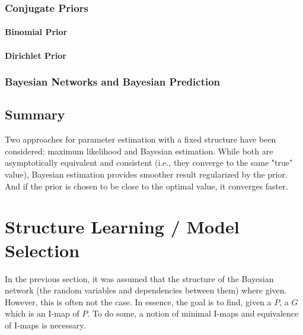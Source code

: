 			\subsubsection{Conjugate Priors} %

				\paragraph{Binomial Prior} %

				\paragraph{Dirichlet Prior} %

			\subsubsection{Bayesian Networks and Bayesian Prediction} %

		\subsection{Summary}
			Two approaches for parameter estimation with a fixed structure have been considered: maximum likelihood and Bayesian estimation. While both are asymptotically equivalent and consistent (i.e., they converge to the same "true" value), Bayesian estimation provides smoother result regularized by the prior. And if the prior is chosen to be close to the optimal value, it converges faster.

	\section{Structure Learning / Model Selection}
		In the previous section, it was assumed that the structure of the Bayesian network (the random variables and dependencies between them) where given. However, this is often not the case. In essence, the goal is to find, given a \(P\), a \(G\) which is an I-map of \(P\). To do some, a notion of minimal I-maps and equivalence of I-maps is necessary.

